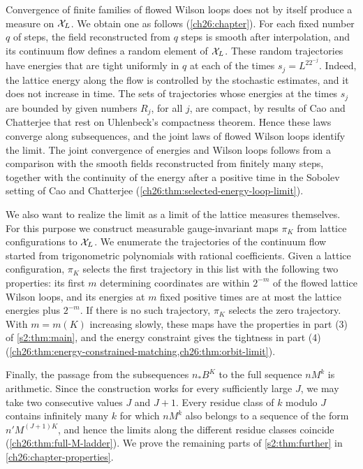 Convergence of finite families of flowed Wilson loops does not by itself produce a measure on $\mathcal X_L$. We obtain one as follows (\cref{ch26:chapter}). For each fixed number $q$ of steps, the field reconstructed from $q$ steps is smooth after interpolation, and its continuum flow defines a random element of $\mathcal X_L$. These random trajectories have energies that are tight uniformly in $q$ at each of the times $s_j=L^22^{-j}$. Indeed, the lattice energy along the flow is controlled by the stochastic estimates, and it does not increase in time. The sets of trajectories whose energies at the times $s_j$ are bounded by given numbers $R_j$, for all $j$, are compact, by results of Cao and Chatterjee that rest on Uhlenbeck's compactness theorem. Hence these laws converge along subsequences, and the joint laws of flowed Wilson loops identify the limit. The joint convergence of energies and Wilson loops follows from a comparison with the smooth fields reconstructed from finitely many steps, together with the continuity of the energy after a positive time in the Sobolev setting of Cao and Chatterjee (\cref{ch26:thm:selected-energy-loop-limit}).

We also want to realize the limit as a limit of the lattice measures themselves. For this purpose we construct measurable gauge-invariant maps $\pi_K$ from lattice configurations to $\mathcal X_L$. We enumerate the trajectories of the continuum flow started from trigonometric polynomials with rational coefficients. Given a lattice configuration, $\pi_K$ selects the first trajectory in this list with the following two properties: its first $m$ determining coordinates are within $2^{-m}$ of the flowed lattice Wilson loops, and its energies at $m$ fixed positive times are at most the lattice energies plus $2^{-m}$. If there is no such trajectory, $\pi_K$ selects the zero trajectory. With $m=m(K)$ increasing slowly, these maps have the properties in part (3) of \cref{s2:thm:main}, and the energy constraint gives the tightness in part (4) (\cref{ch26:thm:energy-constrained-matching,ch26:thm:orbit-limit}).

Finally, the passage from the subsequences $n_*B^K$ to the full sequence $nM^k$ is arithmetic. Since the construction works for every sufficiently large $J$, we may take two consecutive values $J$ and $J+1$. Every residue class of $k$ modulo $J$ contains infinitely many $k$ for which $nM^k$ also belongs to a sequence of the form $n'M^{(J+1)K}$, and hence the limits along the different residue classes coincide (\cref{ch26:thm:full-M-ladder}). We prove the remaining parts of \cref{s2:thm:further} in \cref{ch26:chapter-properties}.

